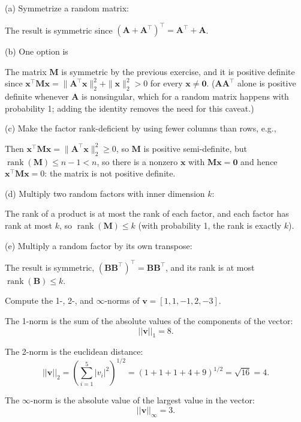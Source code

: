 \begin{solution}
    (a) Symmetrize a random matrix:
    
    The result is symmetric since $(\mathbf{A} + \mathbf{A}^\top)^\top = \mathbf{A}^\top + \mathbf{A}$.

    (b) One option is
    
    The matrix $\mathbf{M}$ is symmetric by the previous exercise, and it is positive definite since $\mathbf{x}^\top \mathbf{M} \mathbf{x} = \|\mathbf{A}^\top\mathbf{x}\|_2^2 + \|\mathbf{x}\|_2^2 > 0$ for every $\mathbf{x} \neq \mathbf{0}$. ($\mathbf{A}\mathbf{A}^\top$ alone is positive definite whenever $\mathbf{A}$ is nonsingular, which for a random matrix happens with probability 1; adding the identity removes the need for this caveat.)

    (c) Make the factor rank-deficient by using fewer columns than rows, e.g.,
    
    Then $\mathbf{x}^\top \mathbf{M} \mathbf{x} = \|\mathbf{A}^\top\mathbf{x}\|_2^2 \geq 0$, so $\mathbf{M}$ is positive semi-definite, but $\operatorname{rank}(\mathbf{M}) \leq n-1 < n$, so there is a nonzero $\mathbf{x}$ with $\mathbf{M}\mathbf{x} = \mathbf{0}$ and hence $\mathbf{x}^\top \mathbf{M} \mathbf{x} = 0$: the matrix is not positive definite.

    (d) Multiply two random factors with inner dimension $k$:
    
    The rank of a product is at most the rank of each factor, and each factor has rank at most $k$, so $\operatorname{rank}(\mathbf{M}) \leq k$ (with probability 1, the rank is exactly $k$).

    (e) Multiply a random factor by its own transpose:
    
    The result is symmetric, $(\mathbf{B}\mathbf{B}^\top)^\top = \mathbf{B}\mathbf{B}^\top$, and its rank is at most $\operatorname{rank}(\mathbf{B}) \leq k$.
\end{solution}

\begin{exercise} %
    Compute the 1-, 2-, and $\infty$-norms of $\mathbf{v}=[1, 1,-1,2,-3]$. 
\end{exercise}

\begin{solution}
    The 1-norm is the sum of the absolute values of the components of the vector:
    \[
        \vert\vert\mathbf{v}\vert\vert_1 = 8.
    \]

    The 2-norm is the euclidean distance:
    \[
        \vert\vert\mathbf{v}\vert\vert_2 = \left(\sum_{i=1}^5 \vert v_i \vert^2\right)^{1/2} = (1+1+1+4+9)^{1/2} = \sqrt{16} = 4.
    \]

    The $\infty$-norm is the absolute value of the largest value in the vector:
    \[
        \vert\vert\mathbf{v}\vert\vert_\infty = 3.
    \]
\end{solution}

